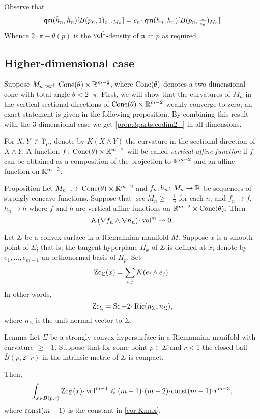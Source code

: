 Observe that 
\[\qm(\hat h_n, \hat h_n)[B(p_n,1)_{c_n\cdot M_n}]
=
c_n\cdot \qm(h_n, h_n)[B(p_n,\tfrac1{c_n})_{M_n}]\]
Whence $2\cdot \pi-\theta(p)$ is the $\operatorname{vol}^1$-density of $\mathfrak n$ at $p$ as required.
\qeds

\subsection{Higher-dimensional case}


Suppose $M_n\smooths{} \Cone(\theta)\times \RR^{m-2}$, where $\operatorname{Cone}(\theta)$ denotes a two-dimensional cone with total angle $\theta<2\cdot\pi$.
First, we will show that the curvatures of $M_n$ in the vertical sectional directions of $\operatorname{Cone}(\theta)\times \mathbb{R}^{m-2}$ weakly converge to zero;
an exact statement is given in the following proposition.
By combining this result with the 3-dimensional case we get \ref{prop:3parts:codim2+} in all dimensions.

For $X,Y\in \mathrm{T}_p$, denote by $K(X\wedge Y)$ the curvature in the sectional direction of $X\wedge Y$.
A function $f\colon\operatorname{Cone}(\theta)\times\mathbb{R}^{m-2}$ will be called \emph{vertical affine function} if $f$ can be obtained as a composition of the projection to $\mathbb{R}^{m-2}$ and an affine function on $\mathbb{R}^{m-2}$.

\begin{thm}{Proposition}\label{prop:vert-vert}
Let $M_n\smooths{} \Cone(\theta)\times\RR^{m-2}$
and $f_n,h_n\colon M_n\to \mathbb{R}$ be sequences of strongly concave functions.
Suppose that $\sec M_n\ge -\tfrac1n$ for each $n$,
and $f_n\to f$, 
$h_n\to h$ where $f$ and $h$ are vertical affine functions on $\mathbb{R}^{m-2}\times \operatorname{Cone}(\theta)$.
Then 
\[K(\nabla f_n\wedge\nabla h_n)\cdot\vol^m \rightharpoonup0.\]

\end{thm}

Let $\Sigma$ be a convex surface in a Riemannian manifold $M$.
Suppose $x$ is a smooth point of $\Sigma$; that is, the tangent hyperplane $H_x$ of $\Sigma$ is defined at $x$;
denote by $e_1,\dots,e_{m-1}$ an orthonormal basis of $H_p$.
Set 
\[\operatorname{\rm Zc}_\Sigma(x)= \sum_{i,j} K(e_i\wedge e_j).\]
In other words, 
\[\Zc_\Sigma=\Sc-2\cdot\Ric(n_\Sigma,n_\Sigma),\]
where $n_\Sigma$ is the unit normal vector to $\Sigma$.

\begin{thm}{Lemma}\label{lem:nonsmooth-convex}
Let $\Sigma$ be a strongly convex hypersurface in a Riemannian manifold with curvature $\ge -1$.
Suppose that for some point $p\in \Sigma$ and $r<1$ the closed ball $\bar B(p,2\cdot r)$ in the intrinsic metric of $\Sigma$ is compact.

Then, 
\[\int_{x\in B(p,r)}\Zc_\Sigma(x)\cdot \vol^{m-1}\le (m-1)\cdot(m-2)\cdot\const(m-1)\cdot r^{m-3},\]
where $\mathrm{const}(m-1)$ is the constant in \ref{cor:Kmax}.
\end{thm}

